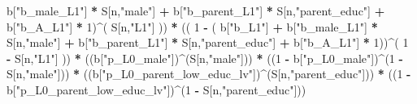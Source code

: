 \documentclass[
]{book}
\newenvironment{Shaded}{\begin{snugshade}}{\end{snugshade}}
\newcommand{\DecValTok}[1]{\textcolor[rgb]{0.00,0.00,0.81}{#1}}
\newcommand{\NormalTok}[1]{#1}
\newcommand{\SpecialCharTok}[1]{\textcolor[rgb]{0.81,0.36,0.00}{\textbf{#1}}}
\newcommand{\StringTok}[1]{\textcolor[rgb]{0.31,0.60,0.02}{#1}}
\begin{document}
\begin{Shaded}
\begin{Highlighting}[]
\NormalTok{           b[}\StringTok{"b\_male\_L1"}\NormalTok{] }\SpecialCharTok{*}\NormalTok{ S[n,}\StringTok{"male"}\NormalTok{] }\SpecialCharTok{+}  
\NormalTok{           b[}\StringTok{"b\_parent\_L1"}\NormalTok{] }\SpecialCharTok{*}\NormalTok{ S[n,}\StringTok{"parent\_educ"}\NormalTok{] }\SpecialCharTok{+}
\NormalTok{           b[}\StringTok{"b\_A\_L1"}\NormalTok{] }\SpecialCharTok{*} \DecValTok{1}\NormalTok{)}\SpecialCharTok{\^{}}\NormalTok{( S[n,}\StringTok{"L1"}\NormalTok{] )) }\SpecialCharTok{*}
\NormalTok{      (( }\DecValTok{1} \SpecialCharTok{{-}}\NormalTok{ ( b[}\StringTok{"b\_L1"}\NormalTok{] }\SpecialCharTok{+}
\NormalTok{                 b[}\StringTok{"b\_male\_L1"}\NormalTok{] }\SpecialCharTok{*}\NormalTok{ S[n,}\StringTok{"male"}\NormalTok{] }\SpecialCharTok{+}  
\NormalTok{                 b[}\StringTok{"b\_parent\_L1"}\NormalTok{] }\SpecialCharTok{*}\NormalTok{ S[n,}\StringTok{"parent\_educ"}\NormalTok{] }\SpecialCharTok{+}
\NormalTok{                 b[}\StringTok{"b\_A\_L1"}\NormalTok{] }\SpecialCharTok{*} \DecValTok{1}\NormalTok{))}\SpecialCharTok{\^{}}\NormalTok{( }\DecValTok{1} \SpecialCharTok{{-}}\NormalTok{ S[n,}\StringTok{"L1"}\NormalTok{] )) }\SpecialCharTok{*}
\NormalTok{      ((b[}\StringTok{"p\_L0\_male"}\NormalTok{])}\SpecialCharTok{\^{}}\NormalTok{(S[n,}\StringTok{"male"}\NormalTok{])) }\SpecialCharTok{*} 
\NormalTok{      ((}\DecValTok{1} \SpecialCharTok{{-}}\NormalTok{ b[}\StringTok{"p\_L0\_male"}\NormalTok{])}\SpecialCharTok{\^{}}\NormalTok{(}\DecValTok{1} \SpecialCharTok{{-}}\NormalTok{ S[n,}\StringTok{"male"}\NormalTok{])) }\SpecialCharTok{*} 
\NormalTok{      ((b[}\StringTok{"p\_L0\_parent\_low\_educ\_lv"}\NormalTok{])}\SpecialCharTok{\^{}}\NormalTok{(S[n,}\StringTok{"parent\_educ"}\NormalTok{])) }\SpecialCharTok{*}
\NormalTok{      ((}\DecValTok{1} \SpecialCharTok{{-}}\NormalTok{ b[}\StringTok{"p\_L0\_parent\_low\_educ\_lv"}\NormalTok{])}\SpecialCharTok{\^{}}\NormalTok{(}\DecValTok{1} \SpecialCharTok{{-}}\NormalTok{ S[n,}\StringTok{"parent\_educ"}\NormalTok{])) }
    

\end{Highlighting}
\end{Shaded}
\end{document}
